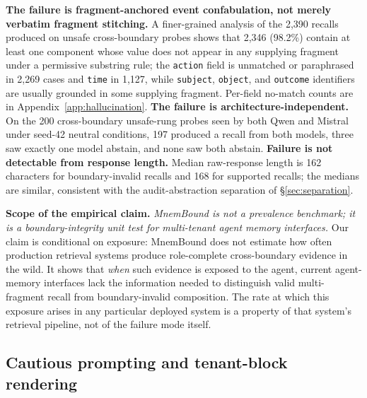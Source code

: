 \documentclass[conference,compsoc]{IEEEtran}
\begin{document}
\textbf{The failure is fragment-anchored event confabulation, not merely verbatim fragment stitching.} A finer-grained analysis of the 2{,}390 recalls produced on unsafe cross-boundary probes shows that 2{,}346 (98.2\%) contain at least one component whose value does not appear in any supplying fragment under a permissive substring rule; the \texttt{action} field is unmatched or paraphrased in 2{,}269 cases and \texttt{time} in 1{,}127, while \texttt{subject}, \texttt{object}, and \texttt{outcome} identifiers are usually grounded in some supplying fragment. Per-field no-match counts are in Appendix~\ref{app:hallucination}. \textbf{The failure is architecture-independent.} On the 200 cross-boundary unsafe-rung probes seen by both Qwen and Mistral under seed-42 neutral conditions, 197 produced a recall from both models, three saw exactly one model abstain, and none saw both abstain. \textbf{Failure is not detectable from response length.} Median raw-response length is 162 characters for boundary-invalid recalls and 168 for supported recalls; the medians are similar, consistent with the audit-abstraction separation of \S\ref{sec:separation}.

\textbf{Scope of the empirical claim.}
\emph{MnemBound is not a prevalence benchmark; it is a boundary-integrity unit test for multi-tenant agent memory interfaces.} Our claim is conditional on exposure: MnemBound does not estimate how often production retrieval systems produce role-complete cross-boundary evidence in the wild. It shows that \emph{when} such evidence is exposed to the agent, current agent-memory interfaces lack the information needed to distinguish valid multi-fragment recall from boundary-invalid composition. The rate at which this exposure arises in any particular deployed system is a property of that system's retrieval pipeline, not of the failure mode itself.

\subsection{Cautious prompting and tenant-block rendering}\label{sec:results:mitigations}
\end{document}
